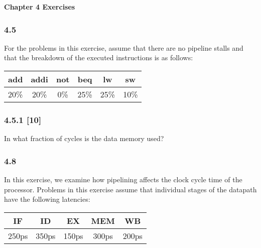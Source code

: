 \documentclass[fleqn]{article}
\begin{document}
\pagestyle{fancy}
\fancyhead{}
\fancyhead[R]{\thepage}
\fancyfoot{}

\begin{center}
    \Large{\textbf{Chapter 4 Exercises}}\\
\end{center}
\vspace{0.25in}

\subsubsection*{4.5} For the problems in this exercise, assume that there are no pipeline stalls and that the breakdown of the
executed instructions is as follows:

\begin{table}[H]
    \centering
    \begin{tabular}{|c|c|c|c|c|c|}
    \hline
    \rowcolor[HTML]{1391DB} 
    add & addi & not & beq & lw & sw \\ \hline \hline
    20\% & 20\% & 0\% & 25\% & 25\% & 10\% \\ \hline
    \end{tabular}
\end{table}


\subsubsection*{4.5.1 [10] \textrangle} In what fraction of cycles is the data memory used?
\vspace{0.125in}

\subsubsection*{4.8} In this exercise, we examine how pipelining affects the clock cycle time of the processor. Problems in
this exercise assume that individual stages of the datapath have the following latencies:

\begin{table}[H]
    \centering
    \begin{tabular}{|c|c|c|c|c|}
    \hline
    \rowcolor[HTML]{1391DB} 
    IF & ID & EX & MEM & WB \\ \hline \hline
    250ps & 350ps & 150ps & 300ps & 200ps \\ \hline
    \end{tabular}
\end{table}
\end{document}
